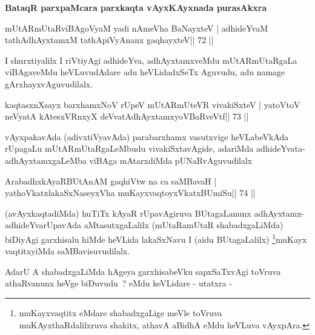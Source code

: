 \begin{center}
\textbf{BataqR parxpaMcara parxkaqta vAyxKAyxnada purasAkxra}
\end{center}



\begin{shl}
mUtARmUtaRviBAgoV\s yaM yadi nAmeVha BaNayxteV |
adhideYvaM tathA\s dhAyxtamxM tathA\s piVyAnanx gaqhayxteV\hfill || 72 ||
\end{shl}

\begin{artha}
I shurxtiyalilx I riVtiyAgi adhideYva, adhAyxtamxveMdu mUtARmUtaRgaLa viBAgaveMdu heVLuvudAdare adu heVLidadxSeTx Aguvudu, adu namage gArxhayxvAguvudilalx.
\end{artha}



\begin{shl}
kaqtasxnXsayx barxhamxNoV rUpeV mUtARmUteVR vivakiSxteV |
yatoV\s toV neVyatA kAtesxVRnxyX deVvatAdhAyxtamxyoVBaRveVtf\hfill || 73 ||
\end{shl}

\begin{artha}
vAyxpakavAda (adivxtiVyavAda) parabarxhamx vasutxvige heVLabeVkAda
rUpagaLu mUtARmUtaRgaLeMbudu vivakiSxtavAgide, adariMda
adhideYvata-adhAyxtamxgaLeMba viBAga mAtarxdiMda pUNaRvAguvudilalx
\end{artha}

\begin{shl}
ArabadhxkAyaRBUtAnAM gaqhiVtw na ca saMBavaH |
yathoVkatxlakaSxNaseyxVha muKayxvaqtoyxVkatxBUmiSu\hfill || 74 ||
\end{shl}

\begin{artha}
(avAyxkaqtadiMda) huTiTx kAyaR rUpavAgiruva BUtagaLanunx adhAyxtamx-adhi\-deYvarUpavAda aMtasutxgaLalilx (mUtaRamUtaR   shabadxgaLiMda) biDiyAgi garxhisalu hiMde heVLida lakaSxNavu I (aidu   BUtagaLalilx) \footnote{muKayxvaqtitx eMdare shabadxgaLige meVle toVruva muKAyxthaRdalilxruva shakitx, athavA aBidhA eMdu heVLuva vAyxpAra.}muKayx vaqtitxyiMda saMBavisuvudilalx.
\end{artha}

\begin{artha}
AdarU A shabadxgaLiMda hAgeya garxhisabeVku sapxSaTxvAgi toVruva
athaRvanunx heVge biDuvudu~? eMdu keVLidare - utatxra -
\end{artha}

